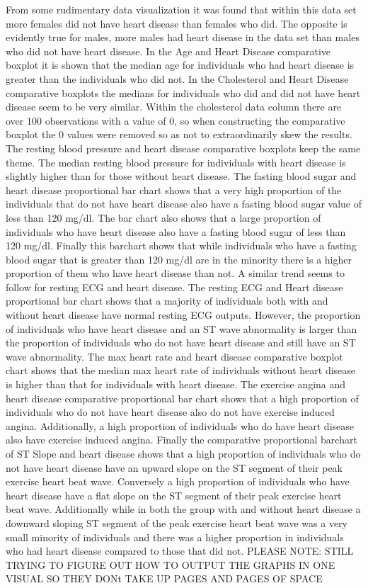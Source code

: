 \documentclass[12pt]{article}
\begin{document}
From some rudimentary data visualization it was found that within this data set more females did not have heart disease than females who did. The opposite is evidently true for males, more males had heart disease in the data set than males who did not have heart disease. In the Age and Heart Disease comparative boxplot it is shown that the median age for individuals who had heart disease is greater than the individuals who did not. In the Cholesterol and Heart Disease comparative boxplots the medians for individuals who did and did not have heart disease seem to be very similar. Within the cholesterol data column there are over 100 observations with a value of 0, so when constructing the comparative boxplot the 0 values were removed so as not to extraordinarily skew the results.  The resting blood pressure and heart disease comparative boxplots keep the same theme. The median resting blood pressure for individuals with heart disease is slightly higher than for those without heart disease. The fasting blood sugar and heart disease proportional bar chart shows that a very high proportion of the individuals that do not have heart disease also have a fasting blood sugar value of less than 120 mg/dl. The bar chart also shows that a large proportion of individuals who have heart disease also have a fasting blood sugar of less than 120 mg/dl. Finally this barchart shows that while individuals who have a fasting blood sugar that is greater than 120 mg/dl are in the minority there is a higher proportion of them who have heart disease than not. A similar trend seems to follow for resting ECG and heart disease. The resting ECG and Heart disease proportional bar chart shows that a majority of individuals both with and without heart disease have normal resting ECG outputs. However, the proportion of individuals who have heart disease and an ST wave abnormality is larger than the proportion of individuals who do not have heart disease and still have an ST wave abnormality. The max heart rate and heart disease comparative boxplot chart shows that the median max heart rate of individuals without heart disease is higher than that for individuals with heart disease. The exercise angina and heart disease comparative proportional bar chart shows that a high proportion of individuals who do not have heart disease also do not have exercise induced angina. Additionally, a high proportion of individuals who do have heart disease also have exercise induced angina. Finally the comparative proportional barchart of ST Slope and heart disease shows that a high proportion of individuals who do not have heart disease have an upward slope on the ST segment of their peak exercise heart beat wave. Conversely a high proportion of individuals who have heart disease have a flat slope on the ST segment of their peak exercise heart beat wave. Additionally while in both the group with and without heart disease a downward sloping ST segment of the peak exercise heart beat wave was a very small minority of individuals and there was a higher proportion in individuals who had heart disease compared to those that did not.
PLEASE NOTE: STILL TRYING TO FIGURE OUT HOW TO OUTPUT THE GRAPHS IN ONE VISUAL SO THEY DONt TAKE UP PAGES AND PAGES OF SPACE 
\end{document}

